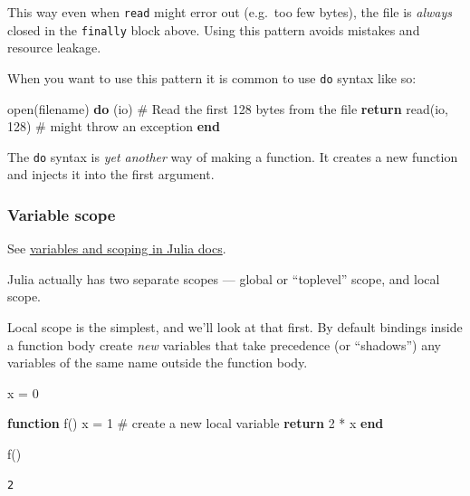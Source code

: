 \documentclass[
]{article}
\newenvironment{Shaded}{\begin{snugshade}}{\end{snugshade}}
\newcommand{\CommentTok}[1]{\textcolor[rgb]{0.37,0.37,0.37}{#1}}
\newcommand{\ControlFlowTok}[1]{\textcolor[rgb]{0.00,0.23,0.31}{\textbf{#1}}}
\newcommand{\FloatTok}[1]{\textcolor[rgb]{0.68,0.00,0.00}{#1}}
\newcommand{\FunctionTok}[1]{\textcolor[rgb]{0.28,0.35,0.67}{#1}}
\newcommand{\KeywordTok}[1]{\textcolor[rgb]{0.00,0.23,0.31}{\textbf{#1}}}
\newcommand{\NormalTok}[1]{\textcolor[rgb]{0.00,0.23,0.31}{#1}}
\newcommand{\OperatorTok}[1]{\textcolor[rgb]{0.37,0.37,0.37}{#1}}
\begin{document}
This way even when \texttt{read} might error out (e.g.~too few bytes),
the file is \emph{always} closed in the \texttt{finally} block above.
Using this pattern avoids mistakes and resource leakage.

When you want to use this pattern it is common to use \texttt{do} syntax
like so:

\begin{Shaded}
\begin{Highlighting}[]
\FunctionTok{open}\NormalTok{(filename) }\ControlFlowTok{do}\NormalTok{ (io)}
   \CommentTok{\# Read the first 128 bytes from the file}
   \ControlFlowTok{return} \FunctionTok{read}\NormalTok{(io, }\FloatTok{128}\NormalTok{) }\CommentTok{\# might throw an exception}
\ControlFlowTok{end}
\end{Highlighting}
\end{Shaded}

The \texttt{do} syntax is \emph{yet another} way of making a function.
It creates a new function and injects it into the first argument.

\subsubsection{Variable scope}\label{variable-scope}

See
\href{https://docs.julialang.org/en/v1/manual/variables-and-scoping/}{variables
and scoping in Julia docs}.

Julia actually has two separate scopes --- global or ``toplevel'' scope,
and local scope.

Local scope is the simplest, and we'll look at that first. By default
bindings inside a function body create \emph{new} variables that take
precedence (or ``shadows'') any variables of the same name outside the
function body.

\begin{Shaded}
\begin{Highlighting}[]
\NormalTok{x }\OperatorTok{=} \FloatTok{0}

\KeywordTok{function} \FunctionTok{f}\NormalTok{()}
\NormalTok{   x }\OperatorTok{=} \FloatTok{1} \CommentTok{\# create a new local variable}
   \ControlFlowTok{return} \FloatTok{2} \OperatorTok{*}\NormalTok{ x}
\KeywordTok{end}

\FunctionTok{f}\NormalTok{()}
\end{Highlighting}
\end{Shaded}

\begin{verbatim}
2
\end{verbatim}
\end{document}
